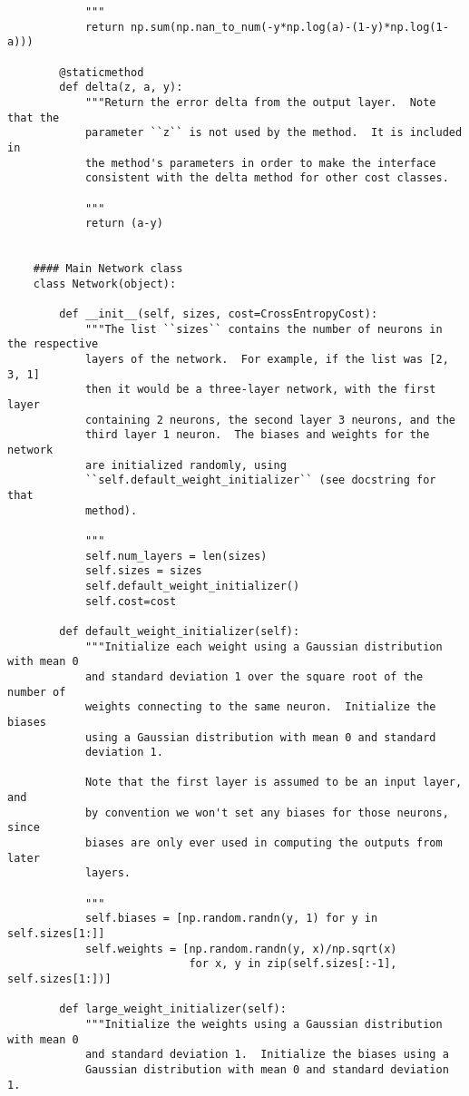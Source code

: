 \begin{lstlisting}
            """
            return np.sum(np.nan_to_num(-y*np.log(a)-(1-y)*np.log(1-a)))
    
        @staticmethod
        def delta(z, a, y):
            """Return the error delta from the output layer.  Note that the
            parameter ``z`` is not used by the method.  It is included in
            the method's parameters in order to make the interface
            consistent with the delta method for other cost classes.
    
            """
            return (a-y)
    
    
    #### Main Network class
    class Network(object):
    
        def __init__(self, sizes, cost=CrossEntropyCost):
            """The list ``sizes`` contains the number of neurons in the respective
            layers of the network.  For example, if the list was [2, 3, 1]
            then it would be a three-layer network, with the first layer
            containing 2 neurons, the second layer 3 neurons, and the
            third layer 1 neuron.  The biases and weights for the network
            are initialized randomly, using
            ``self.default_weight_initializer`` (see docstring for that
            method).
    
            """
            self.num_layers = len(sizes)
            self.sizes = sizes
            self.default_weight_initializer()
            self.cost=cost
    
        def default_weight_initializer(self):
            """Initialize each weight using a Gaussian distribution with mean 0
            and standard deviation 1 over the square root of the number of
            weights connecting to the same neuron.  Initialize the biases
            using a Gaussian distribution with mean 0 and standard
            deviation 1.
    
            Note that the first layer is assumed to be an input layer, and
            by convention we won't set any biases for those neurons, since
            biases are only ever used in computing the outputs from later
            layers.
    
            """
            self.biases = [np.random.randn(y, 1) for y in self.sizes[1:]]
            self.weights = [np.random.randn(y, x)/np.sqrt(x)
                            for x, y in zip(self.sizes[:-1], self.sizes[1:])]
    
        def large_weight_initializer(self):
            """Initialize the weights using a Gaussian distribution with mean 0
            and standard deviation 1.  Initialize the biases using a
            Gaussian distribution with mean 0 and standard deviation 1.
    

\end{lstlisting}
